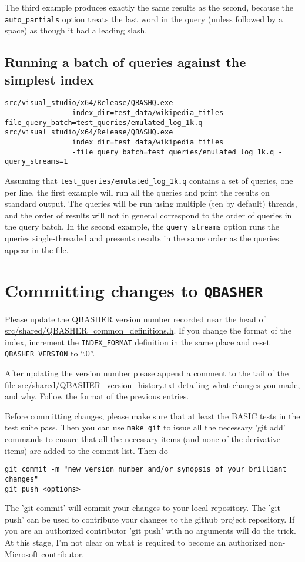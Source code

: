 \documentclass{article}
\newcommand{\projectName}{\texttt{QBASHER}}
\begin{document}
\noindent The third example produces exactly the same results as the second,
because the \texttt{auto\_partials} option treats the last word in the
query (unless followed by a space) as though it had a leading slash.


\subsection{Running a batch of queries against the simplest index}
{\footnotesize
\begin{verbatim}
src/visual_studio/x64/Release/QBASHQ.exe
                index_dir=test_data/wikipedia_titles -file_query_batch=test_queries/emulated_log_1k.q 
src/visual_studio/x64/Release/QBASHQ.exe
                index_dir=test_data/wikipedia_titles
                -file_query_batch=test_queries/emulated_log_1k.q -query_streams=1
\end{verbatim}
}

Assuming that \texttt{test\_queries/emulated\_log\_1k.q} contains a
set of queries, one per line, the first example will run all the
queries and print the results on standard output.   The queries will
be run using multiple (ten by default) threads, and the order of
results will not in general correspond to the order of queries in the
query batch.   In the second example, the \texttt{query\_streams}
option runs the queries single-threaded and presents results in the
same order as the queries appear in the file.

\section{Committing changes to \projectName}

Please update the QBASHER version number recorded near the head of
\url{src/shared/QBASHER_common_definitions.h}.  If you change the
format of the index, increment the \texttt{INDEX\_FORMAT} definition
in the same place and reset \texttt{QBASHER\_VERSION} to ``.0''.

After updating the version number please append a comment to the tail
of the file \url{src/shared/QBASHER_version_history.txt}
detailing what changes you made, and why.  Follow the format of the
previous entries.

Before committing changes, please make sure that at least the BASIC
tests in the test suite pass.  Then you can use \texttt{make git} to
issue all the necessary 'git add' commands to ensure that all the
necessary items (and none of the derivative items) are added to the
commit list.   Then do 
\begin{verbatim}
git commit -m "new version number and/or synopsis of your brilliant changes"
git push <options>
\end{verbatim}

The 'git commit' will commit your changes to your local repository.
The 'git push' can be used to contribute your changes to the github
project repository.  If you are an authorized contributor 'git push'
with no arguments will do the trick.   At this stage, I'm not clear on
what is required to become an authorized non-Microsoft contributor.
\end{document}
